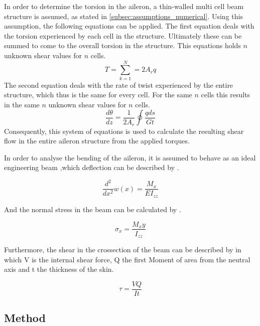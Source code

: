 In order to determine the torsion in the aileron, a thin-walled multi cell beam structure is assumed, as stated in \autoref{subsec:assumptions_numerical}. Using this assumption, the following equations can be applied. The first equation deals with the torsion experienced by each cell in the structure. Ultimately these can be summed to come to the overall torsion in the structure. This equations holds $n$ unknown shear values for $n$ cells.
\begin{equation}
    T=\sum_{k=1}^{N}=2 A_{r} q
\end{equation}
The second equation deals with the rate of twist experienced by the entire structure, which thus is the same for every cell. For the same $n$ cells this results in the same $n$ unknown shear values for $n$ cells.
\begin{equation}
    \frac{d \theta}{d z}=\frac{1}{2 A_{r}} \oint \frac{q d s}{G t}
\end{equation}
Consequently, this system of equations is used to calculate the resulting shear flow in the entire aileron structure from the applied torques.\par
In order to analyse the bending of the aileron, it is assumed to behave as an ideal engineering beam ,which deflection can be described by  .

\begin{equation}
    \frac{d^2}{d x^2}w(x) = \frac{M_x}{E I_{zz}}
    \label{eq:Beamformula}
\end{equation}

And the normal stress in the beam can be calculated by  .

\begin{equation}
    \sigma_x = \frac{M_x y}{I_{zz}}
    \label{eq:stress_bending}
\end{equation}

Furthermore, the shear in the crossection of the beam can be described by  in which V is the internal shear force, Q the first Moment of area from the neutral axis and t the thickness of the skin. 

\begin{equation}
    \tau = \frac{V Q}{I t}
    \label{eq:bending_shear}
\end{equation}


\subsection{Method}
